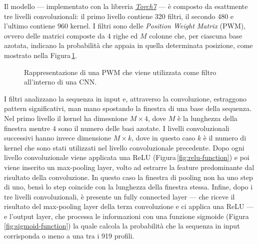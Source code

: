 Il modello — implementato con la libreria \href{https://github.com/torch/torch7}{\textsl{Torch7}} — è composto da esattmente tre livelli convoluzionali: il primo livello contiene 320 filtri, il secondo 480 e l'ultimo contiene 960 kernel. I filtri sono delle \textit{Position Weight Matrix} (\acs{PWM}), ovvero delle matrici composte da $4$ righe ed $M$ colonne che, per ciascuna base azotata, indicano la probabilità che appaia in quella determinata posizione, come mostrato nella Figura\,\ref{fig:PWM}.
% 
\begin{figure}[!b]
    \centering
    
    \caption[Rappresentazione di una \acs{PWM}.]{Rappresentazione di una \acs{PWM} che viene utilizzata come filtro all'interno di una \acs{CNN}.}\label{fig:PWM}
\end{figure}
% 
I filtri analizzano la sequenza in input e, attraverso la convoluzione, estraggono pattern significativi, man mano spostando la finestra di una base della sequenza. Nel primo livello il kernel ha dimesnione $M\times 4$, dove $M$ è la lunghezza della finestra mentre $4$ sono il numero delle basi azotate. I livelli convoluzionali successivi hanno invece dimensione $M\times k$, dove in questo caso $k$ è il numero di kernel che sono stati utilizzati nel livello convoluzionale precedente. Dopo ogni livello convoluzionale viene applicata una \acs{ReLU} (Figura\,\ref{fig:relu-function}) e poi viene inserito un max-pooling layer, volto ad estrarre la feature predominante dal risultato della convoluzione. In questo caso la finestra di pooling non ha uno step di uno, bensì lo step coincide con la lunghezza della finestra stessa. Infine, dopo i tre livelli convoluzionali, è presente un fully connected layer — che riceve il risultato del max-pooling layer della terza convoluzione e ci applica una \acs{ReLU} — e l'output layer, che processa le informazioni con una funzione sigmoide (Figura\,\ref{fig:sigmoid-function}) la quale calcola la probabilità che la sequenza in input corrisponda o meno a una tra i 919 profili.

